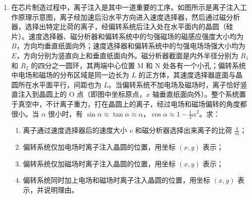 \documentclass[\gkver]{gaokaozhenti}
\begin{document}
\begin{enumerate}
\item
在芯片制造过程中，离子注入是其中一道重要的工序。如图所示是离子注入工作原理示意图，离子经加速后沿水平方向进入速度选择器，然后通过磁分析器，选择出特定比荷的离子，经偏转系统后注入处在水平面内的晶圆（硅片）。速度选择器、磁分析器和偏转系统中的匀强磁场的磁感应强度大小均为 $B$，方向均垂直纸面向外；速度选择器和偏转系统中的匀强电场场强大小均为 $E$，方向分别为竖直向上和垂直纸面向外。磁分析器截面是内外半径分别为 $R_{1}$ 和 $R_{2}$ 的四分之一圆环，其两端中心位置 M 和 N 处各有一个小孔；偏转系统中电场和磁场的分布区域是同一边长为 $L$ 的正方体，其速度选择器底面与晶圆所在水平面平行，间距也为 $L$。当偏转系统不加电场及磁场时，离子恰好竖直注入到晶圆上的 O 点（即图中坐标原点，$x$ 轴垂直纸面向外）。整个系统置于真空中，不计离子重力，打在晶圆上的离子，经过电场和磁场偏转的角度都很小。当 $\alpha$ 很小时，有 $\sin\alpha \approx \tan\alpha \approx \alpha$，$\cos\alpha \approx 1 - \frac{1}{2}\alpha^{2}$。求：

\begin{enumerate}
	\item
	离子通过速度选择器后的速度大小 $v$ 和磁分析器选择出来离子的比荷 $\frac{q}{m}$；
	\item
	偏转系统仅加电场时离子注入晶圆的位置，用坐标 $(x, y)$ 表示；
	\item
	偏转系统仅加磁场时离子注入晶圆的位置，用坐标 $(x, y)$ 表示；
	\item
	偏转系统同时加上电场和磁场时离子注入晶圆的位置，用坐标 $(x, y)$ 表示，并说明理由。
\end{enumerate}


\end{enumerate}
\end{document}

